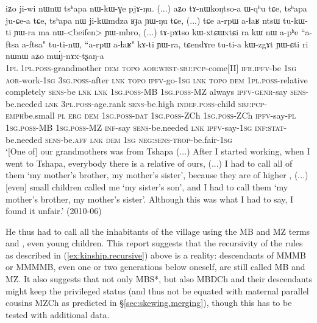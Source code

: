  \begin{exe}
\ex \label{ex:aftsa.beifen}
\gll  iʑo ji-wi nɯnɯ tsʰapa nɯ-kɯ-ɣe pjɤ-ŋu. (...)   aʑo tɤ-nɯkoŋtso-a ɯ-qʰu tɕe, tsʰapa ju-ɕe-a tɕe, tsʰapa nɯ ji-kɯmdza ʁɟa ɲɯ-ŋu tɕe, (...) tɕe a-rpɯ a-ɬaʁ ntsɯ tu-kɯ-ti ɲɯ-ra ma nɯ-<beifen> ɲɯ-mbro, (...)   tɤ-pɤtso kɯ-xtɕɯ\redp{}xtɕi ra kɯ nɯ a-pʰe ``a-ftsa a-ftsa" tu-ti-nɯ, ``a-rpɯ a-ɬaʁ" kɤ-ti ɲɯ-ra, tɕendɤre tu-ti-a kɯ-zgɤt ɲɯ-ɕti ri nɯnɯ aʑo mɯ́j-nɤx-tʂaŋ-a   \\
\textsc{1pl} \textsc{1pl}.\textsc{poss}-grandmother \textsc{dem}  \textsc{topo} \textsc{aor}:\textsc{west}-\textsc{sbj}:\textsc{pcp}-come[II] \textsc{ifr}.\textsc{ipfv}-be { } \textsc{1sg} \textsc{aor}-work-\textsc{1sg} \textsc{3sg}.\textsc{poss}-after \textsc{lnk}  \textsc{topo} \textsc{ipfv}-go-\textsc{1sg} \textsc{lnk}  \textsc{topo} \textsc{dem} \textsc{1pl}.\textsc{poss}-relative completely \textsc{sens}-be \textsc{lnk} { } \textsc{lnk} \textsc{1sg}.\textsc{poss}-MB \textsc{1sg}.\textsc{poss}-MZ always \textsc{ipfv}-\textsc{genr}-say \textsc{sens}-be.needed \textsc{lnk} \textsc{3pl}.\textsc{poss}-age.rank \textsc{sens}-be.high {  } \textsc{indef}.\textsc{poss}-child \textsc{sbj}:\textsc{pcp}-\textsc{emph}\redp{}be.small \textsc{pl} \textsc{erg} \textsc{dem}  \textsc{1sg}.\textsc{poss}-\textsc{dat}  \textsc{1sg}.\textsc{poss}-ZCh  \textsc{1sg}.\textsc{poss}-ZCh \textsc{ipfv}-say-\textsc{pl}  \textsc{1sg}.\textsc{poss}-MB \textsc{1sg}.\textsc{poss}-MZ \textsc{inf}-say \textsc{sens}-be.needed \textsc{lnk} \textsc{ipfv}-say-\textsc{1sg} \textsc{inf}:\textsc{stat}-be.needed \textsc{sens}-be.\textsc{aff} \textsc{lnk} \textsc{dem} \textsc{1sg} \textsc{neg}:\textsc{sens}-\textsc{trop}-be.fair-\textsc{1sg} \\
\glt `[One of] our grandmothers was from Tshapa (...) After I started working, when I went to Tshapa, everybody there is a relative of ours, (...) I had to call all of them `my mother's brother, my mother's sister', because they are of higher , (...) [even] small children called me `my sister's son', and I had to call them  `my mother's brother, my mother's sister'. Although this was what I had to say, I found it unfair.' (2010-06)
 \end{exe}
 
He thus had to call all the inhabitants of the village using the MB  and MZ  terms   and , even young children. This report suggests that the recursivity of the rules as described in (\ref{ex:kinship.recursive}) above is a reality: descendants of MMMB or MMMMB, even one or two generations below oneself, are still called MB and MZ. It also suggests that not only MBS*, but also MBDCh and their descendants might keep the privileged status (and thus not be equated with maternal parallel cousins MZCh as predicted in §\ref{sec:skewing.merging}), though this has to be tested with additional data.


